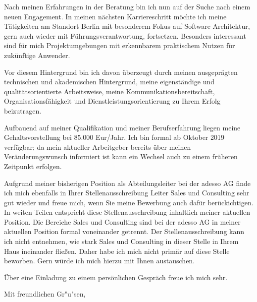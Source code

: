 \documentclass[10pt,a4paper]{dinbrief}
\begin{document}
\begin{letter}
Nach meinen Erfahrungen in der Beratung bin ich nun auf der Suche nach einem neuen Engagement. In meinen nächsten Karriereschritt möchte ich meine Tätigkeiten am Standort Berlin mit besonderem Fokus auf Software Architektur, gern auch wieder mit Führungsverantwortung, fortsetzen. Besonders interessant sind für mich Projektumgebungen mit erkennbarem praktischem Nutzen für zukünftige Anwender.\clearpage

Vor diesem Hintergrund bin ich davon überzeugt durch meinen ausgeprägten technischen und akademischen Hintergrund, meine eigenständige und qualitätsorientierte Arbeitsweise, meine Kommunikationsbereitschaft, Organisationsfähigkeit und Dienstleistungsorientierung zu Ihrem Erfolg beizutragen.

Aufbauend auf meiner Qualifikation und meiner Berufserfahrung liegen meine Gehaltsvorstellung bei 85.000 Eur/Jahr. Ich bin formal ab Oktober 2019 verfügbar; da mein aktueller Arbeitgeber bereits über meinen Veränderungswunsch informiert ist kann ein Wechsel auch zu einem früheren Zeitpunkt erfolgen.

Aufgrund meiner bisherigen Position als Abteilungsleiter bei der adesso AG finde ich mich ebenfalls in Ihrer Stellenausschreibung Leiter Sales und Consulting sehr gut wieder und freue mich, wenn Sie meine Bewerbung auch dafür berückichtigen. In weiten Teilen entspricht diese Stellenausschreibung inhaltlich meiner aktuellen Position. Die Bereiche Sales und Consulting sind bei der adesso AG in meiner aktuellen Position formal voneinander getrennt. Der Stellenausschreibung kann ich nicht entnehmen, wie stark Sales und Consulting in dieser Stelle in Ihrem Haus ineinander fließen. Daher habe ich mich nicht primär auf diese Stelle beworben. Gern würde ich mich hierzu mit Ihnen austauschen.

Über eine Einladung zu einem persönlichen Gespräch freue ich mich sehr.

\closing{Mit freundlichen Gr"u"sen,}
\end{letter}
\end{document}

